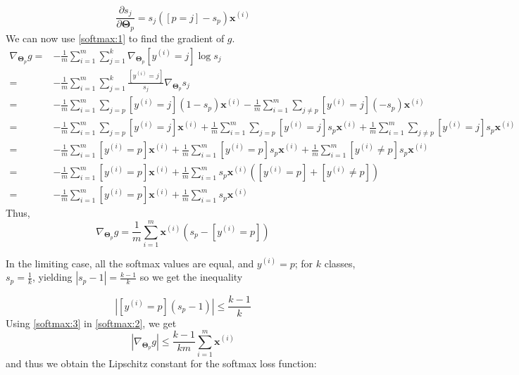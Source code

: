 \documentclass{article}
\begin{document}
\begin{equation}
    \frac{\partial s_j}{\partial \boldsymbol\Theta_p} = s_j([p=j]-s_p)\textbf{x}^{(i)} \label{softmax:1}
\end{equation}
We can now use \eqref{softmax:1} to find the gradient of $g$.
\[
    \begin{aligned}
        \nabla_{\boldsymbol\Theta_p} g =& -\frac{1}{m} \sum\limits_{i=1}^m \sum\limits_{j=1}^k \nabla_{\boldsymbol\Theta_p} [y^{(i)}=j]\log s_j \\
        =& -\frac{1}{m} \sum\limits_{i=1}^m \sum\limits_{j=1}^k \frac{[y^{(i)}=j]}{s_j} \nabla_{\boldsymbol\Theta_p} s_j \\
        =& -\frac{1}{m} \sum\limits_{i=1}^m \sum\limits_{j=p} [y^{(i)}=j] (1-s_p)\textbf{x}^{(i)} - \frac{1}{m} \sum\limits_{i=1}^m \sum\limits_{j \neq p} [y^{(i)}=j](-s_p)\textbf{x}^{(i)} \\
        =& -\frac{1}{m} \sum\limits_{i=1}^m \sum\limits_{j=p} [y^{(i)}=j]\textbf{x}^{(i)} + \frac{1}{m} \sum\limits_{i=1}^m \sum\limits_{j=p} [y^{(i)}=j]s_p \textbf{x}^{(i)} + \frac{1}{m} \sum\limits_{i=1}^m \sum\limits_{j \neq p} [y^{(i)}=j]s_p \textbf{x}^{(i)} \\
        =& -\frac{1}{m} \sum\limits_{i=1}^m [y^{(i)}=p]\textbf{x}^{(i)} + \frac{1}{m} \sum\limits_{i=1}^m [y^{(i)}=p]s_p \textbf{x}^{(i)} + \frac{1}{m} \sum\limits_{i=1}^m [y^{(i)} \neq p] s_p \textbf{x}^{(i)} \\
        =& -\frac{1}{m} \sum\limits_{i=1}^m [y^{(i)}=p]\textbf{x}^{(i)} + \frac{1}{m} \sum\limits_{i=1}^m s_p \textbf{x}^{(i)} \left( [y^{(i)}=p] + [y^{(i)} \neq p] \right) \\
        =& -\frac{1}{m} \sum\limits_{i=1}^m [y^{(i)}=p]\textbf{x}^{(i)} + \frac{1}{m} \sum\limits_{i=1}^m s_p \textbf{x}^{(i)}
    \end{aligned}
\]
Thus,
\begin{equation}
    \nabla_{\boldsymbol\Theta_p} g = \frac{1}{m} \sum\limits_{i=1}^m \textbf{x}^{(i)} \left(s_p - [y^{(i)}=p] \right) \label{softmax:2}
\end{equation}

In the limiting case, all the softmax values are equal, and $y^{(i)} = p$; for $k$ classes, $s_p = \frac{1}{k}$, yielding $|s_p-1| = \frac{k-1}{k}$ so we get the inequality

\begin{equation}
    |[y^{(i)} = p](s_p-1)| \leq \frac{k-1}{k} \label{softmax:3}
\end{equation}
Using \eqref{softmax:3} in \eqref{softmax:2}, we get
\[
    |\nabla_{\boldsymbol\Theta_p} g| \leq \frac{k-1}{km} \sum\limits_{i=1}^m \textbf{x}^{(i)}
\]
and thus we obtain the Lipschitz constant for the softmax loss function:
\end{document}
